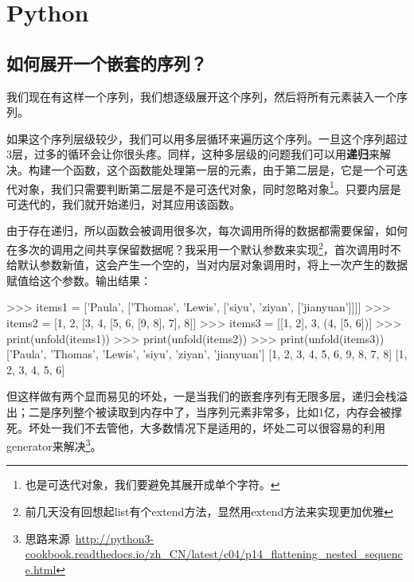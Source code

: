 \chapter{Python}

\section{如何展开一个嵌套的序列？}

我们现在有这样一个序列，我们想逐级展开这个序列，然后将所有元素装入一个序列。

如果这个序列层级较少，我们可以用多层循环来遍历这个序列。一旦这个序列超过3层，过多的循环会让你很头疼。同样，这种多层级的问题我们可以用\textbf{递归}来解决。构建一个函数，这个函数能处理第一层的元素，由于第二层是，它是一个可迭代对象，我们只需要判断第二层是不是可迭代对象，同时忽略对象\footnote{也是可迭代对象，我们要避免其展开成单个字符。}。只要内层是可迭代的，我们就开始递归，对其应用该函数。


由于存在递归，所以函数会被调用很多次，每次调用所得的数据都需要保留，如何在多次的调用之间共享保留数据呢？我采用一个默认参数来实现\footnote{前几天没有回想起list有个extend方法，显然用extend方法来实现更加优雅}，首次调用时不给默认参数新值，这会产生一个空的，当对内层对象调用时，将上一次产生的数据赋值给这个参数。输出结果：

\begin{pythoncode}
>>> items1 = ['Paula', ['Thomas', 'Lewis', ['siyu', 'ziyan', ['jianyuan']]]]
>>> items2 = [1, 2, [3, 4, [5, 6, [9, 8], 7], 8]]
>>> items3 = [[1, 2], 3, (4, [5, 6])]
>>> print(unfold(items1))
>>> print(unfold(items2))
>>> print(unfold(items3))
['Paula', 'Thomas', 'Lewis', 'siyu', 'ziyan', 'jianyuan']
[1, 2, 3, 4, 5, 6, 9, 8, 7, 8]
[1, 2, 3, 4, 5, 6]
\end{pythoncode}

但这样做有两个显而易见的坏处，一是当我们的嵌套序列有无限多层，递归会栈溢出；二是序列整个被读取到内存中了，当序列元素非常多，比如1亿，内存会被撑死。坏处一我们不去管他，大多数情况下是适用的，坏处二可以很容易的利用generator来解决\footnote{思路来源~\url{http://python3-cookbook.readthedocs.io/zh_CN/latest/c04/p14_flattening_nested_sequence.html}}。


